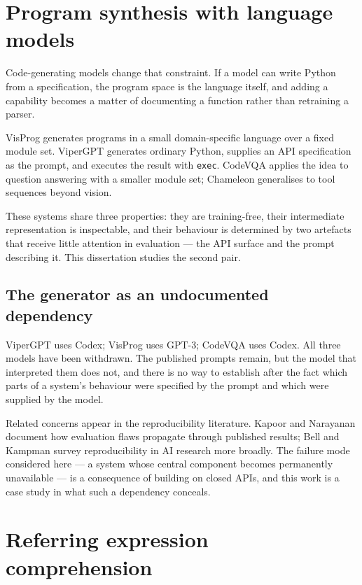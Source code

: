 \documentclass[12pt,a4paper,oneside]{report}
\begin{document}
\section{Program synthesis with language models}

Code-generating models change that constraint. If a model can write Python from a
specification, the program space is the language itself, and adding a capability
becomes a matter of documenting a function rather than retraining a parser.

VisProg \cite{gupta2023visprog} generates programs in a small domain-specific language
over a fixed module set. ViperGPT \cite{suris2023vipergpt} generates ordinary Python,
supplies an API specification as the prompt, and executes the result with
\texttt{exec}. CodeVQA \cite{subramanian2023codevqa} applies the idea to question
answering with a smaller module set; Chameleon \cite{lu2023chameleon} generalises to
tool sequences beyond vision.

These systems share three properties: they are training-free, their intermediate
representation is inspectable, and their behaviour is determined by two artefacts that
receive little attention in evaluation --- the API surface and the prompt describing
it. This dissertation studies the second pair.

\subsection{The generator as an undocumented dependency}

ViperGPT uses Codex; VisProg uses GPT-3; CodeVQA uses Codex. All three models have
been withdrawn. The published prompts remain, but the model that interpreted them does
not, and there is no way to establish after the fact which parts of a system's
behaviour were specified by the prompt and which were supplied by the model.

Related concerns appear in the reproducibility literature. Kapoor and Narayanan
\cite{kapoor2023leakage} document how evaluation flaws propagate through published
results; Bell and Kampman \cite{bell2021perspectives} survey reproducibility in AI
research more broadly. The failure mode considered here --- a system whose central
component becomes permanently unavailable --- is a consequence of building on closed
APIs, and this work is a case study in what such a dependency conceals.

\section{Referring expression comprehension}
\end{document}
